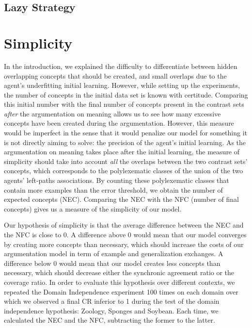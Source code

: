 \subsection{Lazy Strategy}

\section{Simplicity}

In the introduction, we explained the difficulty to differentiate between hidden overlapping concepts that should be created, and small overlaps due to the agent's underfitting initial learning. However, while setting up the experiments, the number of concepts in the initial data set is known with certitude. Comparing this initial number with the final number of concepts present in the contrast sets \emph{after} the argumentation on meaning allows us to see how many excessive concepts have been created during the argumentation. However, this measure would be imperfect in the sense that it would penalize our model for something it is not directly aiming to solve: the precision of the agent's initial learning. As the argumentation on meaning takes place after the initial learning, the measure of simplicity should take into account \emph{all} the overlaps between the two contrast sets' concepts, which corresponds to the polylexematic classes of the union of the two agents' left-paths associations. By counting these polylexematic classes that contain more examples than the error threshold, we obtain the number of expected concepts (NEC). Comparing the NEC with the NFC (number of final concepts) gives us a measure of the simplicity of our model.

Our hypothesis of simplicity is that the average difference between the NEC and the NFC is close to 0. A difference above 0 would mean that our model converges by creating more concepts than necessary, which should increase the costs of our argumentation model in term of example and generalization exchanges. A difference below 0 would mean that our model creates less concepts than necessary, which should decrease either the synchronic agreement ratio or the coverage ratio. In order to evaluate this hypothesis over different contexts, we repeated the Domain Independence experiment 100 times on each domain over which we observed a final CR inferior to 1 during the test of the domain independence hypothesis: Zoology, Sponges and Soybean. Each time, we calculated the NEC and the NFC, subtracting the former to the latter. 

